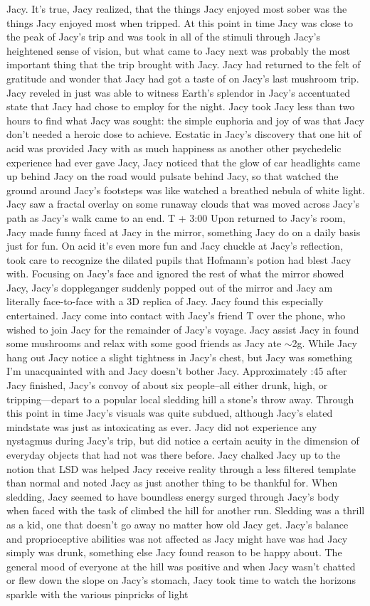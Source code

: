 \documentclass[12pt]{book}
\begin{document}
Jacy. It's true, Jacy realized, that the things Jacy enjoyed most sober was the things Jacy enjoyed most when tripped. At this point in time Jacy was close to the peak of Jacy's trip and was took in all of the stimuli through Jacy's heightened sense of vision, but what came to Jacy next was probably the most important thing that the trip brought with Jacy. Jacy had returned to the felt of gratitude and wonder that Jacy had got a taste of on Jacy's last mushroom trip. Jacy reveled in just was able to witness Earth's splendor in Jacy's accentuated state that Jacy had chose to employ for the night. Jacy took Jacy less than two hours to find what Jacy was sought: the simple euphoria and joy of was that Jacy don't needed a heroic dose to achieve. Ecstatic in Jacy's discovery that one hit of acid was provided Jacy with as much happiness as another other psychedelic experience had ever gave Jacy, Jacy noticed that the glow of car headlights came up behind Jacy on the road would pulsate behind Jacy, so that watched the ground around Jacy's footsteps was like watched a breathed nebula of white light. Jacy saw a fractal overlay on some runaway clouds that was moved across Jacy's path as Jacy's walk came to an end. T + 3:00 Upon returned to Jacy's room, Jacy made funny faced at Jacy in the mirror, something Jacy do on a daily basis just for fun. On acid it's even more fun and Jacy chuckle at Jacy's reflection, took care to recognize the dilated pupils that Hofmann's potion had blest Jacy with. Focusing on Jacy's face and ignored the rest of what the mirror showed Jacy, Jacy's doppleganger suddenly popped out of the mirror and Jacy am literally face-to-face with a 3D replica of Jacy. Jacy found this especially entertained. Jacy come into contact with Jacy's friend T over the phone, who wished to join Jacy for the remainder of Jacy's voyage. Jacy assist Jacy in found some mushrooms and relax with some good friends as Jacy ate $\sim$2g. While Jacy hang out Jacy notice a slight tightness in Jacy's chest, but Jacy was something I'm unacquainted with and Jacy doesn't bother Jacy. Approximately :45 after Jacy finished, Jacy's convoy of about six people--all either drunk, high, or tripping---depart to a popular local sledding hill a stone's throw away. Through this point in time Jacy's visuals was quite subdued, although Jacy's elated mindstate was just as intoxicating as ever. Jacy did not experience any nystagmus during Jacy's trip, but did notice a certain acuity in the dimension of everyday objects that had not was there before. Jacy chalked Jacy up to the notion that LSD was helped Jacy receive reality through a less filtered template than normal and noted Jacy as just another thing to be thankful for. When sledding, Jacy seemed to have boundless energy surged through Jacy's body when faced with the task of climbed the hill for another run. Sledding was a thrill as a kid, one that doesn't go away no matter how old Jacy get. Jacy's balance and proprioceptive abilities was not affected as Jacy might have was had Jacy simply was drunk, something else Jacy found reason to be happy about. The general mood of everyone at the hill was positive and when Jacy wasn't chatted or flew down the slope on Jacy's stomach, Jacy took time to watch the horizons sparkle with the various pinpricks of light 
\end{document}
